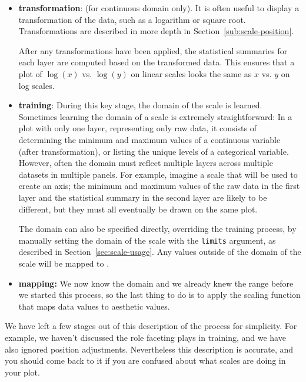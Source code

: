 \begin{itemize}

  \item {\bf transformation}: (for continuous domain only). It is often useful to display a transformation of the data, such as a logarithm or square root. Transformations are described in more depth in Section~\ref{sub:scale-position}. 

  After any transformations have been applied, the statistical summaries for each layer are computed based on the transformed data. This ensures that a plot of $\log(x)$ vs. $\log(y)$ on linear scales looks the same as $x$ vs. $y$ on log scales.

  \item {\bf training}:  During this key stage, the domain of the scale is learned.  Sometimes learning the domain of a scale is extremely straightforward: In a plot with only one layer, representing only raw data, it consists of determining the minimum and maximum values of a continuous variable (after transformation), or listing the unique levels of a categorical variable.  However, often the domain must reflect multiple layers across multiple datasets in multiple panels.  For example, imagine a scale that will be used to create an axis; the minimum and maximum values of the raw data in the first layer and the statistical summary in the second layer are likely to be different, but they must all eventually be drawn on the same plot. 

  The domain can also be specified directly, overriding the training process, by manually setting the domain of the scale with the {\tt limits} argument, as described in Section~\ref{sec:scale-usage}.  Any values outside of the domain of the scale will be mapped to .

  \item {\bf mapping:}  We now know the domain and we already knew the range before we started this process, so the last thing to do is to apply the scaling function that maps data values to aesthetic values.  

\end{itemize}

We have left a few stages out of this description of the process for simplicity.  For example, we haven't discussed the role faceting plays in training, and we have also ignored position adjustments.  Nevertheless this description is accurate, and you should come back to it if you are confused about what scales are doing in your plot.

